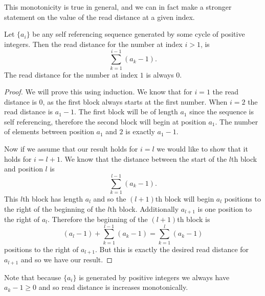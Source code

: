 \documentclass[runningheads,a4paper]{llncs}
\begin{document}
This monotonicity is true in general, and we can in fact make a stronger statement on the value of the read distance at a given index.
\begin{lemma} 
\label{readdistformula}
Let $\{a_i\}$ be any self referencing sequence generated by some cycle of positive integers. Then the read distance for the number at index $i>1$, is 
\begin{equation*}
\sum_{k=1}^{i-1}( a_k - 1).
\end{equation*} 
The read distance for the number at index $1$ is always 0.
\end{lemma}
\begin{proof}
We will prove this using induction. We know that for $i=1$ the read distance is $0$, as the first block always starts at the first number. When $i=2$ the read distance is $a_1-1$. The first block will be of length $a_1$ since the sequence is self referencing, therefore the second block will begin at position $a_1$. The number of elements between position $a_1$ and $2$ is exactly $a_1 -1$.

Now if we assume that our result holds for $i=l$ we would like to show that it holds for $i=l+1$. We know that the distance between the start of the $l$th block and position $l$ is 
\begin{equation*}
\sum_{k=1}^{l-1}( a_k - 1).
\end{equation*} 
This $l$th block has length $a_l$ and so the $(l+1)$th block will begin $a_l$ positions to the right of the beginning of the $l$th block.  Additionally $a_{l+1}$ is one position to the right of $a_l$. Therefore the beginning of the $(l+1)$th block is 
\begin{equation*}
(a_l-1 )+ \sum_{k=1}^{l-1} (a_k-1) = \sum_{k=1}^{l} (a_k-1)
\end{equation*} 
positions to the right of $a_{l+1}$. But this is exactly the desired read distance for $a_{l+1}$ and so we have our result.
\end{proof}
Note that because $\{a_i\}$ is generated by positive integers we always have $a_k-1\geq 0$ and so read distance is increases monotonically. 

\end{document}
